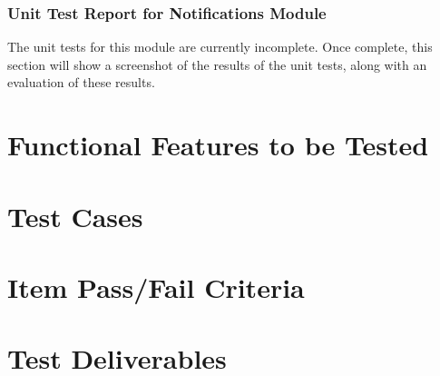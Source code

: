 \documentclass[11pt,fleqn]{book} %
\begin{document}
		\subsection{Unit Test Report for Notifications Module}
			The unit tests for this module are currently incomplete. Once complete, this section will show a screenshot of the results of the unit tests, along with an evaluation of these results.


\chapter{Functional Features to be Tested}



\chapter{Test Cases}
	


\chapter{Item Pass/Fail Criteria}
	


\chapter{Test Deliverables}
	
\end{document}
